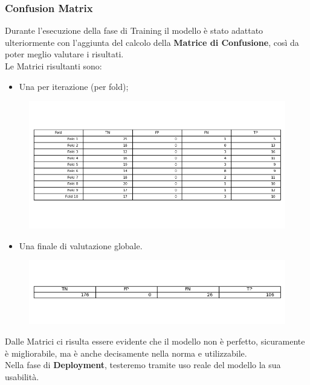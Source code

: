 \documentclass[a4paper,12pt]{report}
\begin{document}
\subsubsection{Confusion Matrix}
Durante l'esecuzione della fase di Training il modello è stato adattato ulteriormente con l'aggiunta del calcolo della \textbf{Matrice di Confusione}, così da poter meglio valutare i risultati.\\
Le Matrici risultanti sono:
\begin{itemize}
    \item Una per iterazione (per fold);
\end{itemize}
\begin{figure}[h]
\centering
\includegraphics[width=\textwidth]{confusion_matrix_perfold.png}
\end{figure}
\begin{itemize}
    \item Una finale di valutazione globale.
\end{itemize}
\begin{figure}[h]
\centering
\includegraphics[width=\textwidth]{confusion_matrix_final.png}
\end{figure}
Dalle Matrici ci risulta essere evidente che il modello non è perfetto, sicuramente è migliorabile, ma è anche decisamente nella norma e utilizzabile.\\
Nella fase di \textbf{Deployment}, testeremo tramite uso reale del modello la sua usabilità.
\newpage
\end{document}
